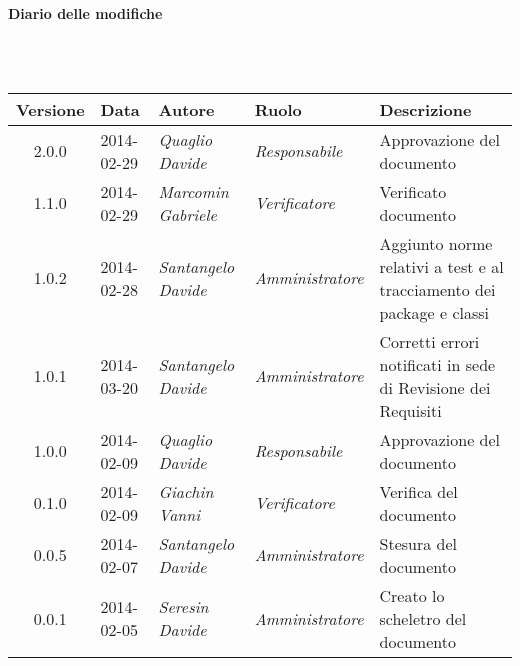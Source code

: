 \noindent\begin{Large}\textbf{Diario delle modifiche}\end{Large}\\
\\
\begin{small}
\begin{tabular}{|c|p{1.8cm}|p{2.8cm}|p{2.8cm}|p{3.5cm}|}
\hline
Versione & Data & Autore & Ruolo & Descrizione \\
\hline
\hline
2.0.0 & 2014-02-29 & 
\textit{Quaglio Davide} &
\textit{Responsabile} & Approvazione del documento\\
\hline
\hline
1.1.0 & 2014-02-29 & 
\textit{Marcomin Gabriele} &
\textit{Verificatore} & Verificato documento\\
\hline
\hline
1.0.2 & 2014-02-28 & 
\textit{Santangelo Davide} &
\textit{Amministratore} &  Aggiunto norme relativi a test e al tracciamento dei package e classi\\
\hline
\hline
1.0.1 & 2014-03-20 & 
\textit{Santangelo Davide} &
\textit{Amministratore} &  Corretti errori notificati in sede di Revisione dei Requisiti\\
\hline
\hline
1.0.0 & 2014-02-09 & 
\textit{Quaglio Davide} &
\textit{Responsabile} &  Approvazione del documento\\
\hline
0.1.0 & 2014-02-09 & 
\textit{Giachin Vanni} &
\textit{Verificatore} &  Verifica del documento\\
\hline
0.0.5 & 2014-02-07 & 
\textit{Santangelo Davide} &
\textit{Amministratore} &  Stesura del documento\\
\hline
0.0.1 & 2014-02-05 & 
\textit{Seresin Davide} &
\textit{Amministratore} &  Creato lo scheletro del documento\\
\hline
\end{tabular}\\
\end{small}